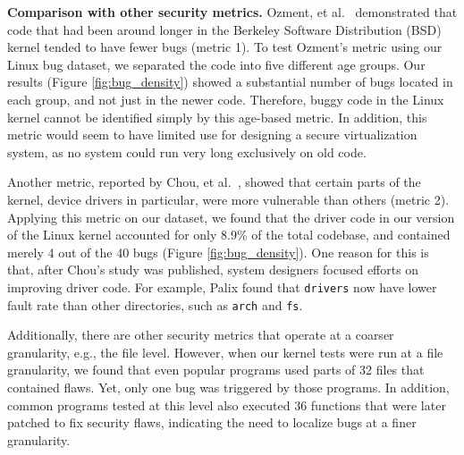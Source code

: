 {\bf Comparison with other security metrics.}
Ozment, et al.~\cite{ozment2006milk} demonstrated that code that
had been around longer in the Berkeley Software Distribution (BSD) \cite{BSD}
kernel tended to have fewer bugs (metric 1).
To test Ozment's metric using our Linux bug dataset,
we separated the code into five different age groups.
Our results (Figure \ref{fig:bug_density}) showed a substantial
number of bugs located in each group, and not just in the newer code.
Therefore, buggy code in the Linux kernel cannot be identified simply
by this age-based metric.
In addition, this metric would seem to have limited use for designing a secure
virtualization system,
as no system could run very long exclusively on old code.

Another metric, reported by Chou, et al.~\cite{PittSFIeld}, showed that certain parts of the kernel,
device drivers in particular, were more vulnerable than others (metric 2).
Applying this metric on our dataset, we found that the driver code in our version
of the Linux kernel accounted for only 8.9\% of the total codebase, and contained
merely 4 out of the 40 bugs (Figure \ref{fig:bug_density}).
One reason for this is that, after Chou's study was published, system
designers focused efforts on improving driver code. For example, Palix \cite{palix2011faults}
found that %
\texttt{drivers} now have lower fault rate than other directories,
such as \texttt{arch} and \texttt{fs}.


Additionally, there are other security metrics that operate at a coarser granularity,
e.g., the file level. However, when our kernel tests were run at a file
granularity, we found that even popular programs used parts of %
32 files that contained flaws. Yet, only one bug was triggered by those programs.
In addition, common programs tested at this level also executed 36 functions
that were later patched to fix security
flaws, indicating the need to localize bugs at a finer granularity.

